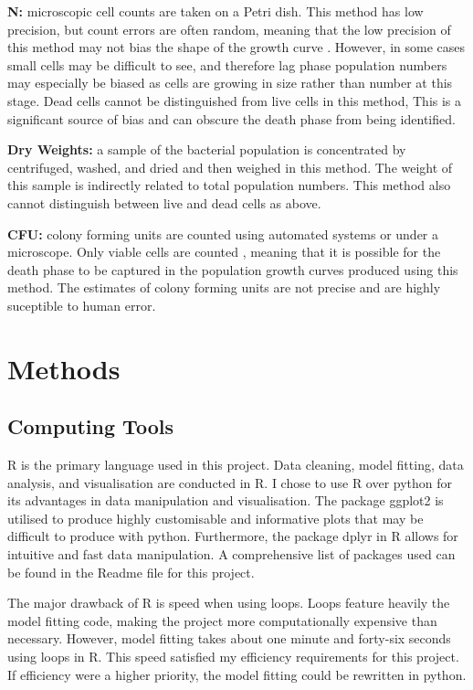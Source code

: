 \documentclass[11pt]{article}
\begin{document}
  \textbf{N:} microscopic cell counts are taken on a Petri dish. This method has low precision, but count errors are often random, meaning that the low precision of this method may not bias the shape of the growth curve \cite{Madigan_Michael2021-07-01}. However, in some cases small cells may be difficult to see, and therefore lag phase population numbers may especially be biased as cells are growing in size rather than number at this stage. Dead cells cannot be distinguished from live cells in this method, This is a significant source of bias and can obscure the death phase from being identified. 

  \textbf{Dry Weights:} a sample of the bacterial population is concentrated by centrifuged, washed, and dried and then weighed in this method. The weight of this sample is indirectly related to total population numbers. This method also cannot distinguish between live and dead cells as above. 

  \textbf{CFU:} colony forming units are counted using automated systems or under a microscope. Only viable cells are counted \citep{Galarz2016}, meaning that it is possible for the death phase to be captured in the population growth curves produced using this method. The estimates of colony forming units are not precise and are highly suceptible to human error. 

  \section{Methods}
  \subsection{Computing Tools}
  R is the primary language used in this project. Data cleaning, model fitting, data analysis, and visualisation are conducted in R. I chose to use R over python for its advantages in data manipulation and visualisation. The package ggplot2 is utilised to produce highly customisable and informative plots that may be difficult to produce with python. Furthermore, the package dplyr in R allows for intuitive and fast data manipulation. A comprehensive list of packages used can be found in the Readme file for this project. 
  
  The major drawback of R is speed when using loops. Loops feature heavily the model fitting code, making the project more computationally expensive than necessary. However, model fitting takes about one minute and forty-six seconds using loops in R. This speed satisfied my efficiency requirements for this project. If efficiency were a higher priority, the model fitting could be rewritten in python. 
\end{document}
